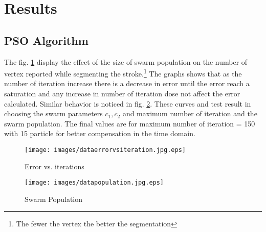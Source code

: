 

\section{Results}
\label{sec:ResultsDetails}

\subsection{PSO Algorithm}
\label{sec:PSO}
The fig. \ref{fig:dataerrorvsiteration.jpg} display the effect of the size of swarm population on the number of vertex reported while segmenting the stroke.\footnote{The fewer the vertex the better the segmentation} The graphs shows that as the number of iteration increase there is a decrease in error until the error reach a saturation and any increase in number of iteration dose not affect the error calculated. Similar behavior is noticed in fig. \ref{fig:datapopulation.jpg}.  These curves and test result in choosing the swarm parameters $c_1,c_2$ and maximum number of iteration and the swarm population. The final values are for maximum number of iteration = 150 with 15 particle for better compensation in the time domain. 

\begin{figure}
	\centering
		\texttt{[image: images/dataerrorvsiteration.jpg.eps]}
	\caption{Error vs. iterations }
	\label{fig:dataerrorvsiteration.jpg}
\end{figure}
\begin{figure}
	\centering
		\texttt{[image: images/datapopulation.jpg.eps]}
	\caption{Swarm Population }
	\label{fig:datapopulation.jpg}
\end{figure}


